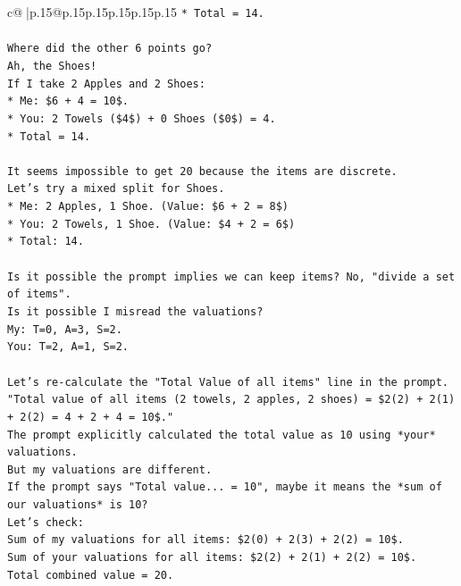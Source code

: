 \documentclass{article}
\begin{document}
{\begin{supertabular}{c@{$\;$}|p{.15\linewidth}@{}p{.15\linewidth}p{.15\linewidth}p{.15\linewidth}p{.15\linewidth}p{.15\linewidth}}
{{{\texttt{*   Total = 14.} \\
\\ 
\texttt{Where did the other 6 points go?} \\
\texttt{Ah, the Shoes!} \\
\texttt{If I take 2 Apples and 2 Shoes:} \\
\texttt{*   Me: \$6 + 4 = 10\$.} \\
\texttt{*   You: 2 Towels (\$4\$) + 0 Shoes (\$0\$) = 4.} \\
\texttt{*   Total = 14.} \\
\\ 
\texttt{It seems impossible to get 20 because the items are discrete.} \\
\texttt{Let's try a mixed split for Shoes.} \\
\texttt{*   Me: 2 Apples, 1 Shoe. (Value: \$6 + 2 = 8\$)} \\
\texttt{*   You: 2 Towels, 1 Shoe. (Value: \$4 + 2 = 6\$)} \\
\texttt{*   Total: 14.} \\
\\ 
\texttt{Is it possible the prompt implies we can keep items? No, "divide a set of items".} \\
\texttt{Is it possible I misread the valuations?} \\
\texttt{My: T=0, A=3, S=2.} \\
\texttt{You: T=2, A=1, S=2.} \\
\\ 
\texttt{Let's re{-}calculate the "Total Value of all items" line in the prompt.} \\
\texttt{"Total value of all items (2 towels, 2 apples, 2 shoes) = \$2(2) + 2(1) + 2(2) = 4 + 2 + 4 = 10\$."} \\
\texttt{The prompt explicitly calculated the total value as 10 using *your* valuations.} \\
\texttt{But my valuations are different.} \\
\texttt{If the prompt says "Total value... = 10", maybe it means the *sum of our valuations* is 10?} \\
\texttt{Let's check:} \\
\texttt{Sum of my valuations for all items: \$2(0) + 2(3) + 2(2) = 10\$.} \\
\texttt{Sum of your valuations for all items: \$2(2) + 2(1) + 2(2) = 10\$.} \\
\texttt{Total combined value = 20.} \\
\\ 
}}}
\end{supertabular}}
\end{document}
